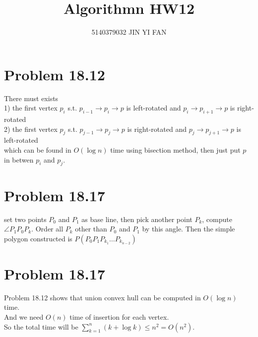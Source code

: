 \documentclass[a4paper]{article}
\title{\textbf{Algorithmn HW12}}
\author{5140379032 JIN YI FAN}
\date{}
\begin{document}
\maketitle
\begin{spacing}{1.3}
\section*{Problem 18.12}
There must exists 
\\1) the first vertex $p_i$ s.t. $p_{i-1}\rightarrow p_i\rightarrow p$ is left-rotated and $p_{i}\rightarrow p_{i+1}\rightarrow p$ is right-rotated
\\2) the first vertex $p_j$ s.t. $p_{j-1}\rightarrow p_j\rightarrow p$ is right-rotated and $p_{j}\rightarrow p_{j+1}\rightarrow p$ is left-rotated
\\which can be found in $O(\log n)$ time using bisection method, then just put $p$ in betwen  $p_i$ and $p_j$.

\section*{Problem 18.17}
set two points $P_0$ and $P_1$ as base line, then pick another point $P_k$, compute $\angle P_1 P_0 P_k$. Order all $P_k$ other than $P_0$ and $P_1$ by this angle. Then the simple polygon constructed is $P(P_0 P_1 P_{k_1} \ldots P_{k_{n-2}})$

\section*{Problem 18.17}
Problem 18.12 shows that union convex hull can be computed in $O(\log n)$ time.
\\And we need $O(n)$ time of insertion for each vertex.
\\So the total time will be $\sum\limits_{k=1}^{n}(k+\log k)\leq n^2=O(n^2)$.
\end{spacing}
\end{document}
